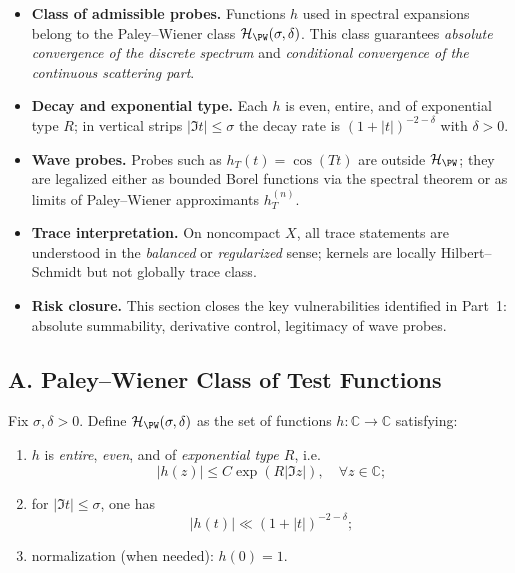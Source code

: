 \begin{tcolorbox}[colback=gray!5,colframe=gray!55,
  title=Scope \& Assumptions (Part 2/5 • Test Functions • ZNB-9+++ Audit • ABSOLUTE FILL++)]
\begin{itemize}
  \item \textbf{Class of admissible probes.} Functions $h$ used in spectral expansions belong to the Paley–Wiener class $\mathcal H_{\PW}(\sigma,\delta)$. This class guarantees \emph{absolute convergence of the discrete spectrum} and \emph{conditional convergence of the continuous scattering part}.
  \item \textbf{Decay and exponential type.} Each $h$ is even, entire, and of exponential type $R$; in vertical strips $|\Im t|\le \sigma$ the decay rate is $(1+|t|)^{-2-\delta}$ with $\delta>0$.
  \item \textbf{Wave probes.} Probes such as $h_T(t)=\cos(Tt)$ are outside $\mathcal H_{\PW}$; they are legalized either as bounded Borel functions via the spectral theorem or as limits of Paley–Wiener approximants $h_T^{(n)}$.
  \item \textbf{Trace interpretation.} On noncompact $X$, all trace statements are understood in the \emph{balanced} or \emph{regularized} sense; kernels are locally Hilbert–Schmidt but not globally trace class.
  \item \textbf{Risk closure.} This section closes the key vulnerabilities identified in Part~1: absolute summability, derivative control, legitimacy of wave probes.
\end{itemize}
\end{tcolorbox}

\subsection*{A. Paley–Wiener Class of Test Functions}
\label{subsec:pw-class-part2}

\begin{definition}
\label{def:pw-class-part2}
Fix $\sigma,\delta>0$. Define $\mathcal H_{\PW}(\sigma,\delta)$ as the set of functions $h:\mathbb C\to\mathbb C$ satisfying:
\begin{enumerate}[label=(\roman*)]
  \item $h$ is \emph{entire}, \emph{even}, and of \emph{exponential type $R$}, i.e.
  \[
    |h(z)|\le C\exp(R|\Im z|),\quad \forall z\in\mathbb C;
  \]
  \item for $|\Im t|\le\sigma$, one has
  \[
    |h(t)|\ll (1+|t|)^{-2-\delta};
  \]
  \item normalization (when needed): $h(0)=1$.
\end{enumerate}
\end{definition}

